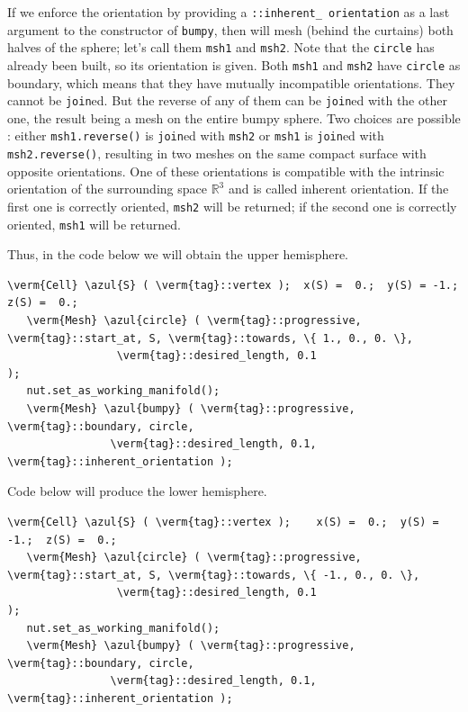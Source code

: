 If we enforce the orientation by providing a {\small\tt {}::inherent\_\,orientation} as a last
argument to the {\small\tt {}} constructor of {\small\tt bumpy}, then {\maniFEM} will mesh
(behind the curtains) both halves of the sphere; let's call them {\small\tt msh1} and {\small\tt msh2}.
Note that the {\small\tt circle} has already been built, so its orientation is given.
Both {\small\tt msh1} and {\small\tt msh2} have {\small\tt circle} as boundary,
which means that they have mutually incompatible orientations.
They cannot be {\small\tt join}ed.
But the reverse of any of them can be {\small\tt join}ed with the other one, the result being a
mesh on the entire bumpy sphere.
Two choices are possible : either {\small\tt msh1.reverse()} is {\small\tt join}ed with {\small\tt msh2}
or {\small\tt msh1} is {\small\tt join}ed with {\small\tt msh2.reverse()}, resulting in two meshes on
the same compact surface with opposite orientations.
One of these orientations is compatible with the intrinsic orientation of the surrounding space
$ \mathbb{R}^3 $ and is called inherent orientation.
If the first one is correctly oriented, {\small\tt msh2} will be returned;
if the second one is correctly oriented, {\small\tt msh1} will be returned.

Thus, in the code below we will obtain the upper hemisphere.

\begin{Verbatim}[commandchars=\\\{\},formatcom=\small\tt,
   baselinestretch=0.94,framesep=2mm                      ]
   \verm{Cell} \azul{S} ( \verm{tag}::vertex );  x(S) =  0.;  y(S) = -1.;  z(S) =  0.;
   \verm{Mesh} \azul{circle} ( \verm{tag}::progressive, \verm{tag}::start_at, S, \verm{tag}::towards, \{ 1., 0., 0. \},
                 \verm{tag}::desired_length, 0.1                                          );
   nut.set_as_working_manifold();
   \verm{Mesh} \azul{bumpy} ( \verm{tag}::progressive, \verm{tag}::boundary, circle,
                \verm{tag}::desired_length, 0.1, \verm{tag}::inherent_orientation );
\end{Verbatim}

Code below will produce the lower hemisphere.

\begin{Verbatim}[commandchars=\\\{\},formatcom=\small\tt,
   baselinestretch=0.94,framesep=2mm                      ]
   \verm{Cell} \azul{S} ( \verm{tag}::vertex );    x(S) =  0.;  y(S) = -1.;  z(S) =  0.;
   \verm{Mesh} \azul{circle} ( \verm{tag}::progressive, \verm{tag}::start_at, S, \verm{tag}::towards, \{ -1., 0., 0. \},
                 \verm{tag}::desired_length, 0.1                                           );
   nut.set_as_working_manifold();
   \verm{Mesh} \azul{bumpy} ( \verm{tag}::progressive, \verm{tag}::boundary, circle,
                \verm{tag}::desired_length, 0.1, \verm{tag}::inherent_orientation );
\end{Verbatim}

